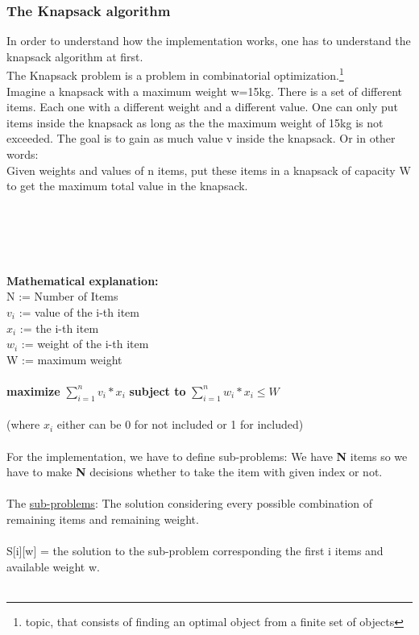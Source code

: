 \subsubsection{The Knapsack algorithm}
In order to understand how the implementation works, one has to understand the knapsack algorithm at first.\\
The Knapsack problem is a problem in combinatorial optimization.\footnote{topic, that consists of finding an optimal object from a finite set of objects}\\
Imagine a knapsack with a maximum weight w=15kg. There is a set of different items. Each one with a different weight and a different value. One can only put items inside the knapsack as long as the the maximum weight of 15kg is not exceeded. The goal is to gain as much value v inside the knapsack. Or in other words:\\
Given weights and values of n items, put these items in a knapsack of capacity W to get the maximum total value in the knapsack.\\\\\\\\\\\\
\textbf{Mathematical explanation:}\\
N := Number of Items\\
$v_i$ := value of the i-th item\\
$x_i$ := the i-th item\\
$w_i$ := weight of the i-th item\\
W := maximum weight\\\\
\textbf{maximize} $\sum\limits_{i=1}^n v_i * x_i$ \tab \textbf{subject to} \tab $\sum\limits_{i=1}^n w_i * x_i \leq W$\\\\
(where $x_i$ either can be 0 for not included or 1 for included)\\\\
For the implementation, we have to define sub-problems: We have \textbf{N} items so we have to make \textbf{N} decisions whether to take the item with given index or not.\\\\
The \underline{sub-problems}: The solution considering every possible combination of remaining items and remaining weight.\\\\
S[i][w] = the solution to the sub-problem corresponding the first i items and available weight w.\\\\
